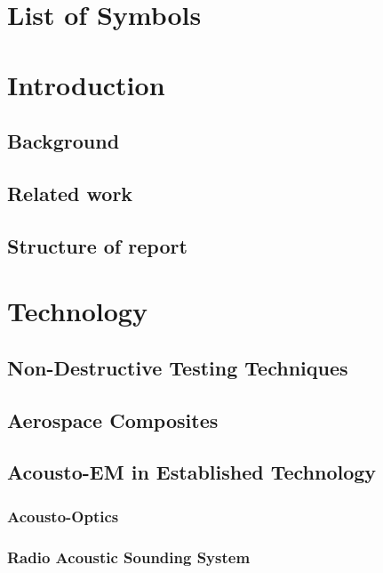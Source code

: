 \documentclass[10pt,a4paper]{eitExjobb}
\begin{document}
	\chapter*{List of Symbols}
	\cleardoublepage
	
	\mainmatter		%
	
	\chapter{Introduction}
	
	\section{Background}
	
	\section{Related work}
	
	\section{Structure of report}
	
	\chapter{Technology}
	
	\section{Non-Destructive Testing Techniques}
	
	\section{Aerospace Composites}
	
	\section{Acousto-EM in Established Technology}
	
	\subsection{Acousto-Optics}
	
	\subsection{Radio Acoustic Sounding System}
	
\end{document}
